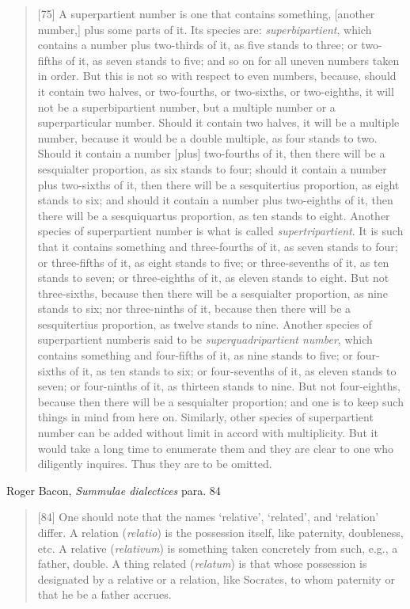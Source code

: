\documentclass{amsart}
\theoremstyle{definition}
\begin{document}
\begin{quote}
[75] A superpartient number is one that contains something, [another number,] plus some parts of it. Its species are: {\em superbipartient}, which contains a number plus two-thirds of it, as five stands to three; or two-fifths of it, as seven stands to five; and so on for all uneven numbers taken
in order. But this is not so with respect to even numbers, because, should it contain two halves, or two-fourths, or two-sixths, or two-eighths, it will not be a superbipartient number, but a multiple number or a superparticular number. Should it contain two halves, it will be a multiple number, because it would be a double multiple, as four stands to two. Should it contain a number [plus] two-fourths of it, then there will be a sesquialter proportion, as six stands to four; should it contain a number plus two-sixths of it, then there will be a sesquitertius proportion, as eight stands to six; and should it contain a number plus two-eighths of it, then there will be a sesquiquartus proportion, as ten stands to eight. Another species of superpartient number
is what is called {\em supertripartient}. It is such that it contains something and three-fourths of it, as seven stands to four; or three-fifths of it, as eight stands to five; or three-sevenths of it, as ten stands to seven; or three-eighths of it, as eleven stands to eight. But not three-sixths, because then there will be a sesquialter proportion, as nine stands to six; nor three-ninths of it, because then there will be a sesquitertius proportion, as twelve stands to nine. Another species of superpartient numberis said to be {\em superquadripartient number}, which contains something and four-fifths of it, as nine stands to five; or four-sixths of it, as ten stands to six; or four-sevenths of it, as eleven stands to seven; or four-ninths of it, as thirteen stands to nine.
But not four-eighths, because then there will be a sesquialter proportion; and one is to keep such things in mind from here on. Similarly, other species of superpartient number can be added without limit in accord with multiplicity. But it would take a long time to enumerate them and they are clear to one who diligently inquires. Thus they are to be omitted.
\end{quote}

Roger Bacon, {\em Summulae dialectices} para. 84 \cite[p.~49]{MST47}

\begin{quote}
[84] One should note that the names `relative', `related', and `relation' differ. A relation ({\em relatio}) is the possession itself, like paternity, doubleness, etc. A relative ({\em relativum}) is something taken concretely from such, e.g., a father, double. A thing related ({\em relatum}) is that whose possession is designated by a relative or a relation, like Socrates, to whom paternity or that he be a father accrues.
\end{quote}
\end{document}
